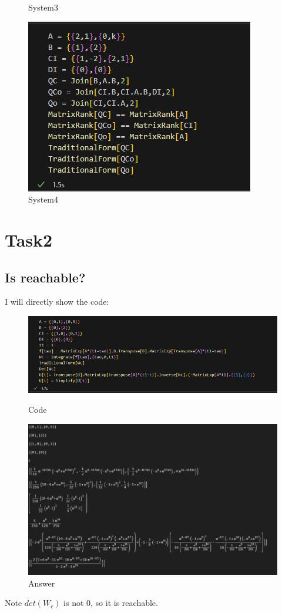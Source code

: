 \documentclass[12pt,a4paper,oneside]{ctexart}
\begin{document}
\begin{figure}[p]
                \caption{System3}
                \includegraphics[height = 0.2\textheight]{../T1S4.PNG}
                \caption{System4}
            \end{figure}

            \newpage
    \section{Task2}
        \subsection{Is reachable?}
        I will directly show the code:
        \begin{figure}[H]
            \centering
            \includegraphics[width = 0.8\linewidth]{../T2.PNG}
            \caption{Code}
            \includegraphics[width = 0.8\linewidth]{../T2A.PNG}
            \caption{Answer}
        \end{figure}
        Note $det(W_c)$ is not 0, so it is reachable.
        \newpage
\end{document}
